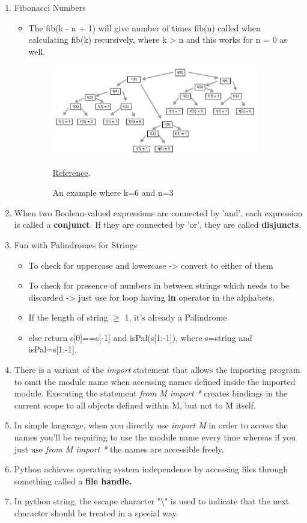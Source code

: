\documentclass[11pt]{article}
\begin{document}
\begin{enumerate}
        \item Fibonacci Numbers
        \begin{itemize}
            \item The fib(k - n + 1) will give number of times fib(n) called when calculating fib(k) recursively, where k > n and this works for n = 0 as well.
            \begin{figure}[htp]
                \centering
                \includegraphics[width=9cm]{imgs/ex1.jpg}
                \caption{An example where k=6 and n=3} \href{https://stackoverflow.com/questions/63136225/how-many-times-does-fib3-gets-called-when-we-call-fib6-using-the-recursive-a}{Reference}.
                \label{fig:galaxy}
            \end{figure}
        \end{itemize}
        \item When two Boolean-valued expressions are connected by 'and', each expression is called a \textbf{conjunct}. If they are connected by 'or', they are called \textbf{disjuncts}.
        \item Fun with Palindromes for Strings
        \begin{itemize}
            \item To check for uppercase and lowercase -> convert to either of them
            \item To check for presence of numbers in between strings which needs to be discarded -> just use for loop having \textbf{in} operator in the alphabets.
            \item If the length of string $\geq$ 1, it's already a Palindrome.
            \item else return s[0]==s[-1] and isPal(s[1:-1]), where s=string and isPal=s[1:-1].
        \end{itemize}
        \item There is a variant of the \textit{import} statement that allows the importing program to omit the module name when accessing names defined inside the imported module. Executing the statement \textit{from M import *} creates bindings in the current scope to all objects defined within 
        M, but not to M itself. 
        \item In simple language, when you directly use \textit{import M} in order to access the names you'll be requiring to use the module name every time whereas if you just use \textit{from M import *} the names are accessible freely.
        \item Python achieves operating system independence by accessing files through something called a \textbf{file handle.}
        \item In python string, the escape character "\textbackslash" is used to indicate that the next character should be treated in a special way.
    \end{enumerate}
\end{document}
